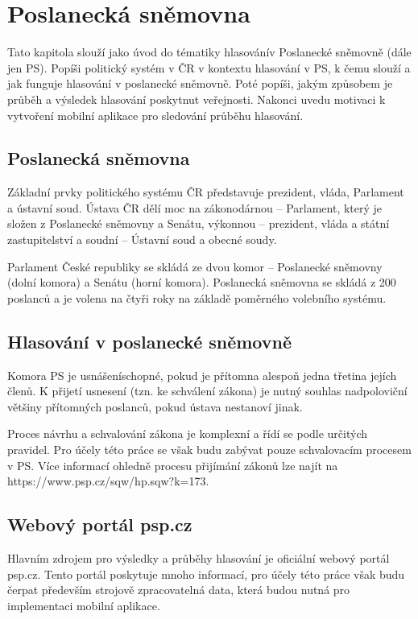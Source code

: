 \chapter{Poslanecká sněmovna}

\setcounter{page}{1}

\begin{chapterabstract}
	Tato kapitola slouží jako úvod do tématiky hlasovánív Poslanecké sněmovně (dále jen PS). Popíši politický systém v ČR v kontextu hlasování v PS, k čemu slouží a jak funguje hlasování v poslanecké sněmovně. Poté popíši, jakým způsobem je průběh a výsledek hlasování poskytnut veřejnosti. Nakonci uvedu motivaci k vytvoření mobilní aplikace pro sledování průběhu hlasování.
\end{chapterabstract}

\section{Poslanecká sněmovna}
Základní prvky politického systému ČR představuje prezident, vláda, Parlament a ústavní soud. Ústava ČR dělí moc na zákonodárnou – Parlament, který je složen z Poslanecké sněmovny a Senátu, výkonnou – prezident, vláda a státní zastupitelství a soudní – Ústavní soud a obecné soudy. \cite{Husek2019-p40}

Parlament České republiky se skládá ze dvou komor – Poslanecké sněmovny (dolní komora) a Senátu (horní komora). Poslanecká sněmovna se skládá z 200 poslanců a je volena na čtyři roky na základě poměrného volebního systému.\cite{Husek2019-p40}

\section{Hlasování v poslanecké sněmovně}
Komora PS je usnášeníschopné, pokud je přítomna alespoň jedna třetina jejích členů. K přijetí usnesení (tzn. ke schválení zákona) je nutný souhlas nadpoloviční většiny přítomných poslanců, pokud ústava nestanoví jinak. \cite{Husek2019-p40}

Proces návrhu a schvalování zákona je komplexní a řídí se podle určitých pravidel. Pro účely této práce se však budu zabývat pouze schvalovacím procesem v PS. Více informací ohledně procesu přijímání zákonů lze najít na https://www.psp.cz/sqw/hp.sqw?k=173.
	

\section{Webový portál psp.cz}
Hlavním zdrojem pro výsledky a průběhy hlasování je oficiální webový portál psp.cz. Tento portál poskytuje mnoho informací, pro účely této práce však budu čerpat především strojově zpracovatelná data, která budou nutná pro implementaci mobilní aplikace.

